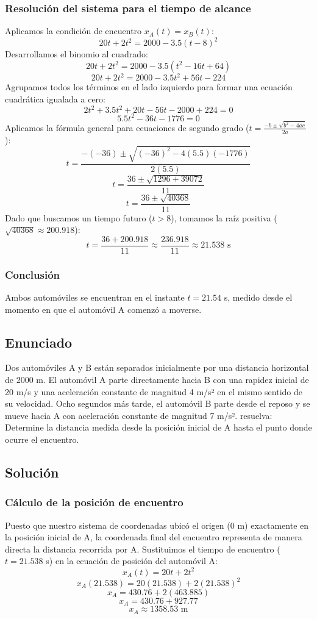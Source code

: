 \documentclass[12pt, a4paper]{article}
\begin{document}
\subsubsection*{Resolución del sistema para el tiempo de alcance}
Aplicamos la condición de encuentro $x_A(t) = x_B(t)$:
$$20t + 2t^2 = 2000 - 3.5(t - 8)^2$$
Desarrollamos el binomio al cuadrado:
$$20t + 2t^2 = 2000 - 3.5(t^2 - 16t + 64)$$
$$20t + 2t^2 = 2000 - 3.5t^2 + 56t - 224$$
Agrupamos todos los términos en el lado izquierdo para formar una ecuación cuadrática igualada a cero:
$$2t^2 + 3.5t^2 + 20t - 56t - 2000 + 224 = 0$$
$$5.5t^2 - 36t - 1776 = 0$$
Aplicamos la fórmula general para ecuaciones de segundo grado ($t = \frac{-b \pm \sqrt{b^2 - 4ac}}{2a}$):
$$t = \frac{-(-36) \pm \sqrt{(-36)^2 - 4(5.5)(-1776)}}{2(5.5)}$$
$$t = \frac{36 \pm \sqrt{1296 + 39072}}{11}$$
$$t = \frac{36 \pm \sqrt{40368}}{11}$$
Dado que buscamos un tiempo futuro ($t > 8$), tomamos la raíz positiva ($\sqrt{40368} \approx 200.918$):
$$t = \frac{36 + 200.918}{11} \approx \frac{236.918}{11} \approx 21.538 \text{ s}$$

\subsubsection*{Conclusión}
Ambos automóviles se encuentran en el instante $t = 21.54$ s, medido desde el momento en que el automóvil A comenzó a moverse.

\newpage
\subsection*{Enunciado}
Dos automóviles A y B están separados inicialmente por una distancia horizontal de 2000 m. El automóvil A parte directamente hacia B con una rapidez inicial de 20 m/s y una aceleración constante de magnitud 4 m/s² en el mismo sentido de su velocidad. Ocho segundos más tarde, el automóvil B parte desde el reposo y se mueve hacia A con aceleración constante de magnitud 7 m/s².
resuelva: Determine la distancia medida desde la posición inicial de A hasta el punto donde ocurre el encuentro.

\subsection*{Solución}

\subsubsection*{Cálculo de la posición de encuentro}
Puesto que nuestro sistema de coordenadas ubicó el origen ($0$ m) exactamente en la posición inicial de A, la coordenada final del encuentro representa de manera directa la distancia recorrida por A. 
Sustituimos el tiempo de encuentro ($t = 21.538$ s) en la ecuación de posición del automóvil A:
$$x_A(t) = 20t + 2t^2$$
$$x_A(21.538) = 20(21.538) + 2(21.538)^2$$
$$x_A = 430.76 + 2(463.885)$$
$$x_A = 430.76 + 927.77$$
$$x_A \approx 1358.53 \text{ m}$$
\end{document}
